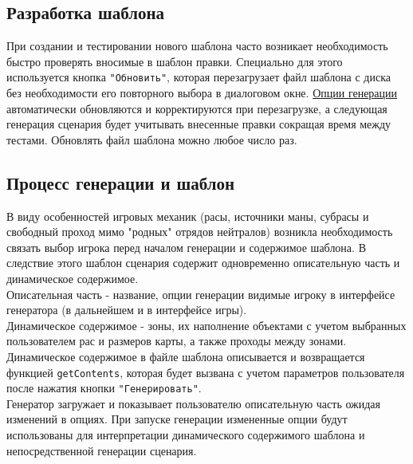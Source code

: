 \newpage
\subsection{Разработка шаблона}
\label{templateDevelopment}
При создании и тестировании нового шаблона часто возникает необходимость быстро проверять вносимые в шаблон правки. Специально для этого используется кнопка \texttt{"Обновить"}, которая перезагрузает файл шаблона с диска без необходимости его повторного выбора в диалоговом окне. \hyperref[templateOptions]{Опции генерации} автоматически обновляются и корректируются при перезагрузке, а следующая генерация сценария будет учитывать внесенные правки сокращая время между тестами. Обновлять файл шаблона можно любое число раз.

\subsection{Процесс генерации и шаблон}
В виду особенностей игровых механик (расы, источники маны, субрасы и свободный проход мимо "родных" отрядов нейтралов) возникла необходимость связать выбор игрока перед началом генерации и содержимое шаблона. В следствие этого шаблон сценария содержит одновременно описательную часть и динамическое содержимое.\\
Описательная часть - название, опции генерации видимые игроку в интерфейсе генератора (в дальнейшем и в интерфейсе игры).\\
Динамическое содержимое - зоны, их наполнение объектами с учетом выбранных пользователем рас и размеров карты, а также проходы между зонами. Динамическое содержимое в файле шаблона описывается и возвращается функцией \texttt{getContents}, которая будет вызвана с учетом параметров пользователя после нажатия кнопки \texttt{"Генерировать"}.\\
Генератор загружает и показывает пользователю описательную часть ожидая изменений в опциях. При запуске генерации измененные опции будут использованы для интерпретации динамического содержимого шаблона и непосредственной генерации сценария.